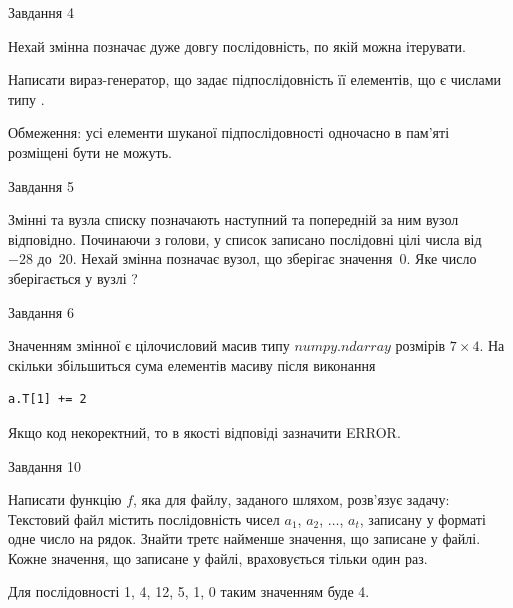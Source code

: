 \documentclass[12pt, ukrainian]{article}
\begin{document}
{\begin{minipage}[t]{8.0cm}
\end{minipage}


               
{\begin{center}Завдання {4}\end{center}}
\vspace{-4mm}
Нехай змінна  позначає дуже довгу послідовність, по якій можна ітерувати.

Написати вираз-генератор, що задає підпослідовність її елементів, що є числами типу .

Обмеження: усі елементи шуканої підпослідовності одночасно в пам'яті розміщені бути не можуть.\par

\vspace{10mm}
               
{\begin{center}Завдання {5}\end{center}}
\vspace{-4mm}
Змінні  та  вузла списку позначають наступний та попередній за ним вузол відповідно. Починаючи з голови, у список записано послідовні цілі числа від~$-28$ до~$20$. Нехай змінна  позначає вузол, що зберігає значення~$0$.
Яке число зберігається у вузлі  ?\par

               
{\begin{center}Завдання {6}\end{center}}
\vspace{-4mm}
Значенням змінної  є цілочисловий масив типу $numpy.ndarray$ розмірів $7{\times}4$. На скільки збільшиться сума елементів масиву  після виконання
\begin{verbatim}
a.T[1] += 2
\end{verbatim}


Якщо код некоректний, то в якості відповіді зазначити ERROR.\par

               
{\begin{center}Завдання {10}\end{center}}
\vspace{-4mm}

Написати функцію $f$, яка для файлу, заданого шляхом, розв’язує задачу:\\ Текстовий файл містить послідовність чисел $a_1$, $a_2$, $\ldots$, $a_t$, записану у форматі одне число на рядок. Знайти третє найменше значення, що записане у файлі. Кожне значення, що записане у файлі, враховується тільки один раз. \par
Для послідовності 1, 4, 12, 5, 1, 0 таким значенням буде 4.

}
\end{document}
